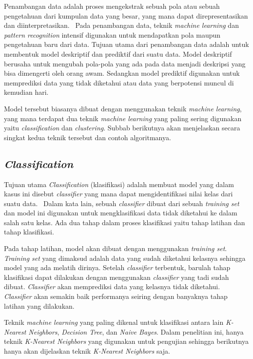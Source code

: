 Penambangan data adalah proses mengekstrak sebuah pola atau sebuah pengetahuan dari kumpulan data yang besar, yang mana dapat direpresentasikan dan diinterpretasikan.~\cite{mendes:17:ppdmieee} Pada penambangan data, teknik \textit{machine learning} dan \textit{pattern recognition} intensif digunakan untuk mendapatkan pola maupun pengetahuan baru dari data. Tujuan utama dari penambangan data adalah untuk membentuk model deskriptif dan prediktif dari suatu data. Model deskriptif berusaha untuk mengubah pola-pola yang ada pada data menjadi deskripsi yang bisa dimengerti oleh orang awam. Sedangkan model prediktif digunakan untuk memprediksi data yang tidak diketahui atau data yang berpotensi muncul di kemudian hari.

Model tersebut biasanya dibuat dengan menggunakan teknik \textit{machine learning}, yang mana terdapat dua teknik \textit{machine learning} yang paling sering digunakan yaitu \textit{classification} dan \textit{clustering}. Subbab berikutnya akan menjelaskan secara singkat kedua teknik tersebut dan contoh algoritmanya.

\subsection{\textit{Classification}}
\label{subsec:classification}

Tujuan utama \textit{Classification} (klasifikasi) adalah membuat model yang dalam kasus ini disebut \textit{classifier} yang mana dapat mengidentifikasi nilai kelas dari suatu data.~\cite{mendes:17:ppdmieee} Dalam kata lain, sebuah \textit{classifier} dibuat dari sebuah \textit{training set} dan model ini digunakan untuk mengklasifikasi data tidak diketahui ke dalam salah satu kelas. Ada dua tahap dalam proses klasifikasi yaitu tahap latihan dan tahap klasifikasi.

Pada tahap latihan, model akan dibuat dengan menggunakan \textit{training set}. \textit{Training set} yang dimaksud adalah data yang sudah diketahui kelasnya sehingga model yang ada melatih dirinya. Setelah \textit{classifier} terbentuk, barulah tahap klasifikasi dapat dilakukan dengan menggunakan \textit{classifier} yang tadi sudah dibuat. \textit{Classifier} akan memprediksi data yang kelasnya tidak diketahui. \textit{Classifier} akan semakin baik performanya seiring dengan banyaknya tahap latihan yang dilakukan.

Teknik \textit{machine learning} yang paling dikenal untuk klasifikasi antara lain \textit{K-Nearest Neighbors}, \textit{Decision Tree}, dan \textit{Naive Bayes}. Dalam penelitian ini, hanya teknik \textit{K-Nearest Neighbors} yang digunakan untuk pengujian sehingga berikutnya hanya akan dijelaskan teknik \textit{K-Nearest Neighbors} saja.

